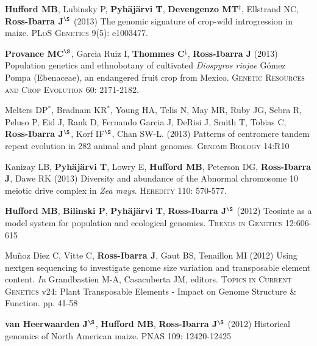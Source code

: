 \documentclass[letterpaper,10pt]{article}
\begin{document}
\begin{etaremune}
\item {\bf Hufford MB}, Lubinsky P, {\bf Pyh\"aj\"arvi T}, {\bf Devengenzo MT}$^\ddagger$, Ellstrand NC, {\bf Ross-Ibarra J}$^\S$ (2013) The genomic signature of crop-wild introgression in maize. \textsc{PLoS Genetics} 9(5): e1003477. %


\item {\bf Provance MC}$^\S$, Garcia Ruiz I, {\bf Thommes C}$^\ddagger$, {\bf Ross-Ibarra J} (2013) Population genetics and ethnobotany of cultivated \emph{Diospyros riojae} G\'omez Pompa (Ebenaceae), an endangered fruit crop from Mexico. \textsc{Genetic Resources and Crop Evolution} 60: 2171-2182.


\item Melters DP$^*$, Bradnam KR$^*$, Young HA, Telis N, May MR, Ruby JG, Sebra R, Peluso P, Eid J, Rank D, Fernando Garcia J, DeRisi J, Smith T, Tobias C, {\bf Ross-Ibarra J}$^\S$, Korf IF$^\S$, Chan SW-L. (2013) Patterns of centromere tandem repeat evolution in 282 animal and plant genomes. \textsc{Genome Biology} 14:R10


\item Kanizay LB, {\bf Pyh\"aj\"arvi T}, Lowry E, {\bf Hufford MB}, Peterson DG, {\bf Ross-Ibarra J}, Dawe RK (2013) Diversity and abundance of the Abnormal chromosome 10 meiotic drive complex in \emph{Zea mays}. \textsc{Heredity} 110: 570-577.


\item {\bf Hufford MB}, {\bf Bilinski P}, {\bf Pyh\"aj\"arvi T}, {\bf Ross-Ibarra J}$^\S$ (2012) Teosinte as a model system for population and ecological genomics. \textsc{Trends in Genetics} 12:606-615 %


\item Mu\~{n}oz Diez C, Vitte C, {\bf Ross-Ibarra J}, Gaut BS, Tenaillon MI (2012) Using nextgen sequencing to investigate genome size variation and transposable element content. \emph{In} Grandbastien M-A, Casacuberta JM, editors. \textsc{Topics in Current Genetics} v24: Plant Transposable Elements - Impact on Genome Structure \& Function. pp. 41-58


\item  {\bf van Heerwaarden J}$^\S$, {\bf Hufford MB}, {\bf Ross-Ibarra J}$^\S$ (2012) Historical genomics of North American maize. \textsc{PNAS} 109: 12420-12425



\end{etaremune}
\end{document}
